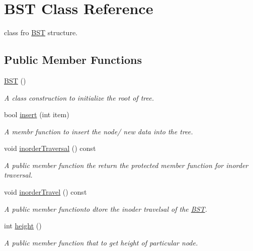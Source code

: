 \hypertarget{classBST}{}\section{B\+ST Class Reference}
\label{classBST}


class fro \hyperlink{classBST}{B\+ST} structure.  


\subsection*{Public Member Functions}
\begin{DoxyCompactItemize}
\item 
\mbox{\label{classBST_abc17123a0367c3b8ad0382eeb3ad3178}} 
\hyperlink{classBST_abc17123a0367c3b8ad0382eeb3ad3178}{B\+ST} ()
\begin{DoxyCompactList}\small\item\em A class construction to initialize the root of tree. \end{DoxyCompactList}\item 
bool \hyperlink{classBST_a5ab5b12888965cf4a366c9547361bc46}{insert} (int item)
\begin{DoxyCompactList}\small\item\em A membr function to insert the node/ new data into the tree. \end{DoxyCompactList}\item 
void \hyperlink{classBST_ac2be220d080c4ca19f5741a0a8458837}{inorder\+Traversal} () const
\begin{DoxyCompactList}\small\item\em A public member function the return the protected member function for inorder traversal. \end{DoxyCompactList}\item 
void \hyperlink{classBST_aba9736b7dae49342204347347f3008a9}{inorder\+Travel} () const
\begin{DoxyCompactList}\small\item\em A public member functionto dtore the inoder travelsal of the \hyperlink{classBST}{B\+ST}. \end{DoxyCompactList}\item 
int \hyperlink{classBST_aa39f19e438fcc809abbf105bc0441952}{height} ()
\begin{DoxyCompactList}\small\item\em A public member function that to get height of particular node. \end{DoxyCompactList}\item 

\end{DoxyCompactItemize}
